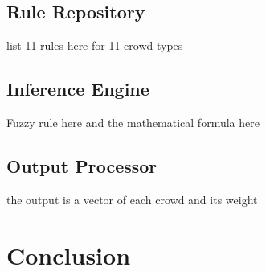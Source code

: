 \subsection{Rule Repository}

list 11 rules here for 11 crowd types

\subsection{Inference Engine}

Fuzzy rule here and the mathematical formula here

\subsection{Output Processor}

the output is a vector of each crowd and its weight

\section{Conclusion}